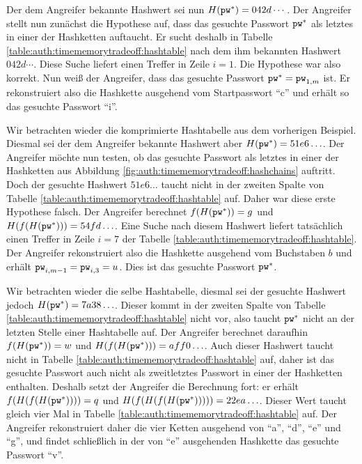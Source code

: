 \begin{beispiel}
Der dem Angreifer bekannte Hashwert sei nun $H(\texttt{pw}^*) = 042d\cdots$.
Der Angreifer stellt nun zunächst die Hypothese auf, dass das gesuchte
Passwort $\texttt{pw}^*$ als letztes in einer der Hashketten auftaucht. Er sucht
deshalb in Tabelle \ref{table:auth:timememorytradeoff:hashtable} nach
dem ihm bekannten Hashwert $042d\cdots$. Diese Suche liefert einen
Treffer in Zeile $i = 1$. Die Hypothese war also korrekt. Nun weiß der
Angreifer, dass das gesuchte Passwort $\texttt{pw}^* = \texttt{pw}_{1,m}$ ist. Er
rekonstruiert also die Hashkette ausgehend vom Startpasswort "`c"' und
erhält so das gesuchte Passwort "`i"'.
\end{beispiel}

\begin{beispiel} Wir betrachten wieder die komprimierte Hashtabelle aus
dem vorherigen Beispiel. Diesmal sei der dem Angreifer bekannte Hashwert
aber $H(\texttt{pw}^*) = 51e6\ldots$.  Der Angreifer möchte nun testen, ob das
gesuchte Passwort als letztes in einer der Hashketten aus Abbildung
\ref{fig:auth:timememorytradeoff:hashchains} auftritt.  Doch der
gesuchte Hashwert $51e6\ldots$ taucht nicht in der zweiten Spalte von
Tabelle \ref{table:auth:timememorytradeoff:hashtable} auf.  Daher war
diese erste Hypothese falsch. Der Angreifer berechnet $f(H(\texttt{pw}^*)) = g$
und $H(f(H(\texttt{pw}^*))) = 54fd\ldots$.  Eine Suche nach diesem Hashwert
liefert tatsächlich einen Treffer in Zeile $i = 7$ der Tabelle
\ref{table:auth:timememorytradeoff:hashtable}.  Der Angreifer
rekonstruiert also die Hashkette ausgehend vom Buchstaben $b$ und erhält
$\texttt{pw}_{i,m-1} = \texttt{pw}_{i,3} = u$.  Dies ist das gesuchte Passwort
$\texttt{pw}^*$.
\end{beispiel}

\begin{beispiel} Wir betrachten wieder die selbe Hashtabelle, diesmal
sei der gesuchte Hashwert jedoch $H(\texttt{pw}^*) = 7a38\ldots$.  Dieser kommt
in der zweiten Spalte von Tabelle
\ref{table:auth:timememorytradeoff:hashtable} nicht vor, also taucht
$\texttt{pw}^*$ nicht an der letzten Stelle einer Hashtabelle auf.  Der
Angreifer berechnet daraufhin $f(H(\texttt{pw}^*)) = w$ und $H(f(H(\texttt{pw}^*))) =
aff0\ldots$. Auch dieser Hashwert taucht nicht in Tabelle
\ref{table:auth:timememorytradeoff:hashtable} auf, daher ist das
gesuchte Passwort auch nicht als zweitletztes Passwort in einer der
Hashketten enthalten.  Deshalb setzt der Angreifer die Berechnung fort:
er erhält $f(H(f(H(\texttt{pw}^*)))) = q$ und $H(f(H(f(H(\texttt{pw}^*))))) =
22ea\ldots$. Dieser Wert taucht gleich vier Mal in Tabelle
\ref{table:auth:timememorytradeoff:hashtable} auf. Der Angreifer
rekonstruiert daher die vier Ketten ausgehend von "`a"', "`d"', "`e"'
und "`g"', und findet schließlich in der von "`e"' ausgehenden Hashkette
das gesuchte Passwort "`v"'.
\end{beispiel}

